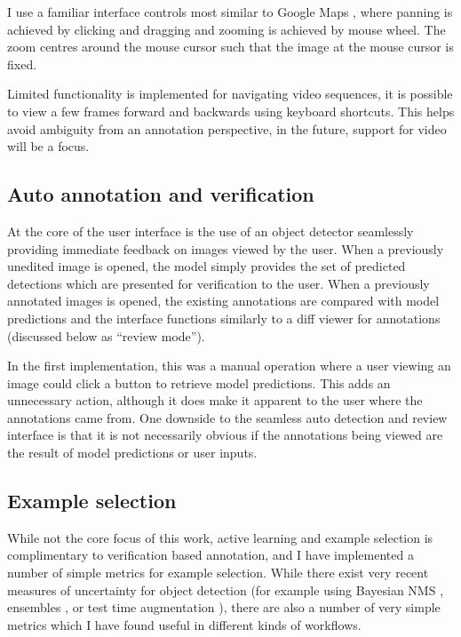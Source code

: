 I use a familiar interface controls most similar to Google Maps \cite{todo}, where panning is achieved by clicking and dragging and zooming is achieved by mouse wheel. The zoom centres around the mouse cursor such that the image at the mouse cursor is fixed.

Limited functionality is implemented for navigating video sequences, it is possible to view a few frames forward and backwards using keyboard shortcuts. This helps avoid ambiguity from an annotation perspective, in the future, support for video will be a focus.

\subsection {Auto annotation and verification}

At the core of the user interface is the use of an object detector seamlessly providing immediate feedback on images viewed by the user. When a previously unedited image is opened, the model simply provides the set of predicted detections which are presented for verification to the user. When a previously annotated images is opened, the existing annotations are compared with model predictions and the interface functions similarly to a diff viewer for annotations (discussed below as ``review mode'').

In the first implementation, this was a manual operation where a user viewing an image could click a button to retrieve model predictions. This adds an unnecessary action, although it does make it apparent to the user where the annotations came from. One downside to the seamless auto detection and review interface is that it is not necessarily obvious if the annotations being viewed are the result of model predictions or user inputs.


\subsection{Example selection}
\label{sec:example_selection}

While not the core focus of this work, active learning and example selection is complimentary to verification based annotation, and I have implemented a number of simple metrics for example selection. While there exist very recent measures of uncertainty for object detection (for example using Bayesian \gls{NMS} \cite{Harakeh}, ensembles \cite{Le2018}, or test time augmentation \cite{Wei2018}), there are also a number of very simple metrics which I have found useful in different kinds of workflows. 

